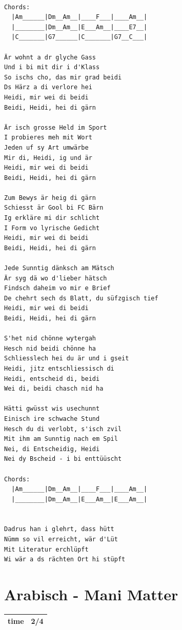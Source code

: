 \documentclass[
]{book}
\let\stdsection\section
\renewcommand\section{\clearpage\stdsection}
\begin{document}
\begin{verbatim}

Chords:
  |Am______|Dm__Am__|____F___|____Am__|
  |________|Dm__Am__|E___Am__|____E7__|
  |C_______|G7______|C_______|G7__C___|

Är wohnt a dr glyche Gass
Und i bi mit dir i d'Klass
So ischs cho, das mir grad beidi
Ds Härz a di verlore hei
Heidi, mir wei di beidi
Beidi, Heidi, hei di gärn

Är isch grosse Held im Sport
I probieres meh mit Wort
Jeden uf sy Art umwärbe
Mir di, Heidi, ig und är
Heidi, mir wei di beidi
Beidi, Heidi, hei di gärn

Zum Bewys är heig di gärn
Schiesst är Gool bi FC Bärn
Ig erkläre mi dir schlicht
I Form vo lyrische Gedicht
Heidi, mir wei di beidi
Beidi, Heidi, hei di gärn

Jede Sunntig dänksch am Mätsch
Är syg dä wo d'lieber hätsch
Findsch daheim vo mir e Brief
De chehrt sech ds Blatt, du süfzgisch tief
Heidi, mir wei di beidi
Beidi, Heidi, hei di gärn

S'het nid chönne wytergah
Hesch nid beidi chönne ha
Schliesslech hei du är und i gseit
Heidi, jitz entschliessisch di
Heidi, entscheid di, beidi
Wei di, beidi chasch nid ha

Hätti gwüsst wis usechunnt
Einisch ire schwache Stund
Hesch du di verlobt, s'isch zvil
Mit ihm am Sunntig nach em Spil
Nei, di Entscheidig, Heidi
Nei dy Bscheid - i bi enttüüscht

Chords:
  |Am______|Dm__Am__|____F___|____Am__|
  |________|Dm__Am__|E___Am__|E___Am__|


Dadrus han i glehrt, dass hütt
Nümm so vil erreicht, wär d'Lüt
Mit Literatur erchlüpft
Wi wär a ds rächten Ort hi stüpft
\end{verbatim}

\hypertarget{arabisch---mani-matter}{%
\section{Arabisch - Mani Matter}\label{arabisch---mani-matter}}

\begin{longtable}[]{@{}ll@{}}
\toprule
\endhead
time & 2/4\tabularnewline
\bottomrule
\end{longtable}
\end{document}
